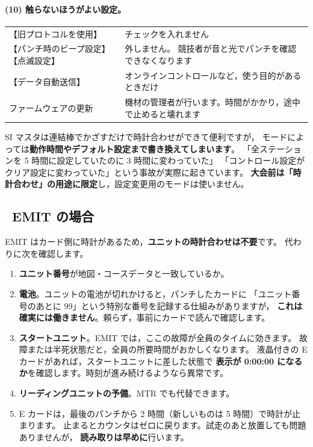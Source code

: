 \paragraph{(10) 触らないほうがよい設定。}

\begin{center}
\small
\begin{tabular}{@{}P{34mm}P{110mm}@{}}
\toprule
{} &  \\
\midrule
【旧プロトコルを使用】 & チェックを入れません \\
【パンチ時のビープ設定】【点滅設定】 & 外しません。
  競技者が音と光でパンチを確認できなくなります \\
【データ自動送信】 & オンラインコントロールなど，使う目的があるときだけ \\
ファームウェアの更新 & 機材の管理者が行います。時間がかかり，途中で止めると壊れます \\
\bottomrule
\end{tabular}
\end{center}

\begin{Note}
SI マスタは連結棒でかざすだけで時計合わせができて便利ですが，
モードによっては\textbf{動作時間やデフォルト設定まで書き換えてしまいます}。
「全ステーションを 5 時間に設定していたのに 3 時間に変わっていた」
「コントロール設定がクリア設定に変わっていた」という事故が実際に起きています。
\textbf{大会前は「時計合わせ」の用途に限定}し，設定変更用のモードは使いません。
\end{Note}

\subsection*{\tEMIT\ EMIT の場合}

EMIT はカード側に時計があるため，\textbf{ユニットの時計合わせは不要}です。
代わりに次を確認します。

\begin{enumerate}
\item \textbf{ユニット番号}が地図・コースデータと一致しているか。
\item \textbf{電池}。ユニットの電池が切れかけると，パンチしたカードに
      「ユニット番号のあとに 99」という特別な番号を記録する仕組みがありますが，
      \textbf{これは確実には働きません}。頼らず，事前にカードで読んで確認します。
\item \textbf{スタートユニット}。EMIT では，ここの故障が全員のタイムに効きます。
      故障または半死状態だと，全員の所要時間がおかしくなります。
      液晶付きの E カードがあれば，スタートユニットに差した状態で
      \textbf{表示が 0:00:00 になるか}を確認します。時刻が進み続けるようなら異常です。
\item \textbf{リーディングユニットの予備}。MTR でも代替できます。
\item E カードは，最後のパンチから 2 時間（新しいものは 5 時間）で時計が止まります。
      止まるとカウンタはゼロに戻ります。試走のあと放置しても問題ありませんが，
      \textbf{読み取りは早めに}行います。
\end{enumerate}

